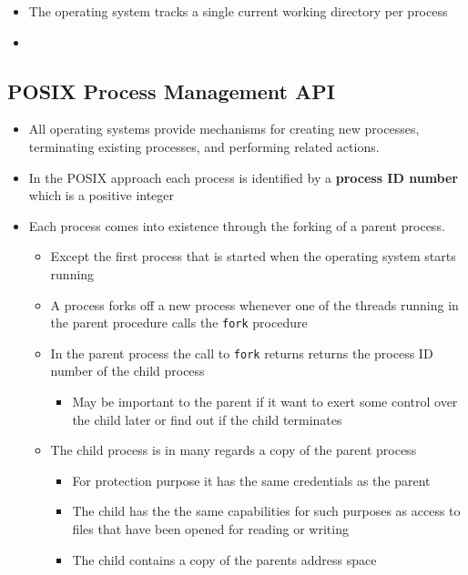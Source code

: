 \documentclass[11pt]{article}
\providecommand{\tightlist}{%
      \setlength{\itemsep}{0pt}\setlength{\parskip}{0pt}}
\begin{document}
\begin{itemize}
\begin{itemize}
    \begin{itemize}
    \item
      The operating system tracks a single current working directory per
      process
    \item
    \end{itemize}
  \end{itemize}
\end{itemize}

    \subsection{POSIX Process Management
API}\label{posix-process-management-api}

\begin{itemize}
\tightlist
\item
  All operating systems provide mechanisms for creating new processes,
  terminating existing processes, and performing related actions.
\item
  In the POSIX approach each process is identified by a \textbf{process
  ID number} which is a positive integer
\item
  Each process comes into existence through the forking of a parent
  process.

  \begin{itemize}
  \tightlist
  \item
    Except the first process that is started when the operating system
    starts running
  \item
    A process forks off a new process whenever one of the threads
    running in the parent procedure calls the \texttt{fork} procedure
  \item
    In the parent process the call to \texttt{fork} returns returns the
    process ID number of the child process

    \begin{itemize}
    \tightlist
    \item
      May be important to the parent if it want to exert some control
      over the child later or find out if the child terminates
    \end{itemize}
  \item
    The child process is in many regards a copy of the parent process

    \begin{itemize}
    \tightlist
    \item
      For protection purpose it has the same credentials as the parent
    \item
      The child has the the same capabilities for such purposes as
      access to files that have been opened for reading or writing
    \item
      The child contains a copy of the parents address space


\end{itemize}
\end{itemize}
\end{itemize}
\end{document}
